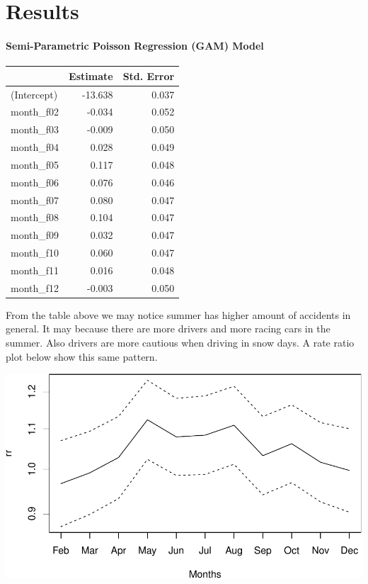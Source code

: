 \documentclass[]{article}
\let\oldparagraph\paragraph
\renewcommand{\paragraph}[1]{\oldparagraph{#1}\mbox{}}
\begin{document}
\section{Results}\label{results}

\paragraph{Semi-Parametric Poisson Regression (GAM)
Model}\label{semi-parametric-poisson-regression-gam-model-1}

\begin{tabular}{l|r|r}
\hline
  & Estimate & Std. Error\\
\hline
(Intercept) & -13.638 & 0.037\\
\hline
month\_f02 & -0.034 & 0.052\\
\hline
month\_f03 & -0.009 & 0.050\\
\hline
month\_f04 & 0.028 & 0.049\\
\hline
month\_f05 & 0.117 & 0.048\\
\hline
month\_f06 & 0.076 & 0.046\\
\hline
month\_f07 & 0.080 & 0.047\\
\hline
month\_f08 & 0.104 & 0.047\\
\hline
month\_f09 & 0.032 & 0.047\\
\hline
month\_f10 & 0.060 & 0.047\\
\hline
month\_f11 & 0.016 & 0.048\\
\hline
month\_f12 & -0.003 & 0.050\\
\hline
\end{tabular}

From the table above we may notice summer has higher amount of accidents
in general. It may because there are more drivers and more racing cars
in the summer. Also drivers are more cautious when driving in snow days.
A rate ratio plot below show this same pattern.

\includegraphics{Project_II-Final-20190404_files/figure-latex/unnamed-chunk-17-1.pdf}
\end{document}
